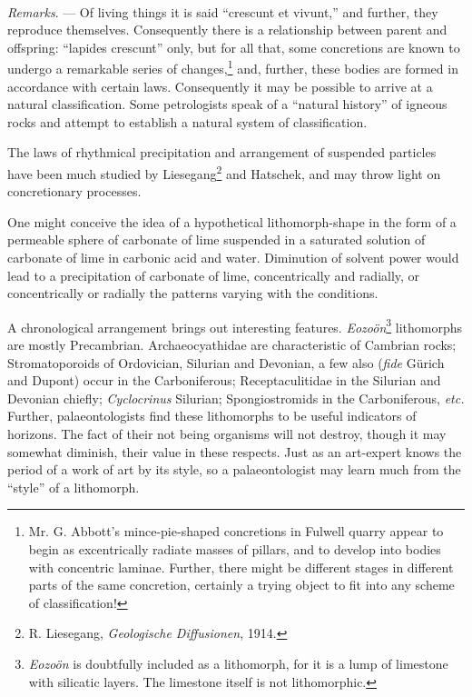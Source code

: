 \documentclass[a4paper, 12pt, oneside]{article}
\begin{document}
\paragraph{}
\emph{Remarks}. --- Of living things it is said ``crescunt et vivunt,'' and further, they reproduce themselves. Consequently there is a relationship between parent and offspring: ``lapides crescunt'' only, but for all that, some concretions are known to undergo a remarkable series of changes,\footnote{Mr. G. Abbott's mince-pie-shaped concretions in Fulwell quarry appear to begin as excentrically radiate masses of pillars, and to develop into bodies with concentric laminae. Further, there might be different stages in different parts of the same concretion, certainly a trying object to fit into any scheme of classification!} and, further, these bodies are formed in accordance with certain laws. Consequently it may be possible to arrive at a natural classification. Some petrologists speak of a ``natural history'' of igneous rocks and attempt to establish a natural system of classification.

The laws of rhythmical precipitation and arrangement of suspended particles have been much studied by Liesegang\footnote{R. Liesegang, \emph{Geologische Diffusionen}, 1914.} and Hatschek, and may throw light on concretionary processes.

One might conceive the idea of a hypothetical lithomorph-shape in the form of a permeable sphere of carbonate of lime suspended in a saturated solution of carbonate of lime in carbonic acid and water. Diminution of solvent power would lead to a precipitation of carbonate of lime, concentrically and radially, or concentrically or radially the patterns varying with the conditions.

A chronological arrangement brings out interesting features. \emph{Eozoön}\footnote{\emph{Eozoön} is doubtfully included as a lithomorph, for it is a lump of limestone with silicatic layers. The limestone itself is not lithomorphic.} lithomorphs are mostly Precambrian. Archaeocyathidae are characteristic of Cambrian rocks; Stromatoporoids of Ordovician, Silurian and Devonian, a few also (\emph{fide} Gürich and Dupont) occur in the Carboniferous; Receptaculitidae in the Silurian and Devonian chiefly; \emph{Cyclocrinus} Silurian; Spongiostromids in the Carboniferous, \emph{etc.} Further, palaeontologists find these lithomorphs to be useful indicators of horizons. The fact of their not being organisms will not destroy, though it may somewhat diminish, their value in these respects. Just as an art-expert knows the period of a work of art by its style, so a palaeontologist may learn much from the ``style'' of a lithomorph.
\end{document}
